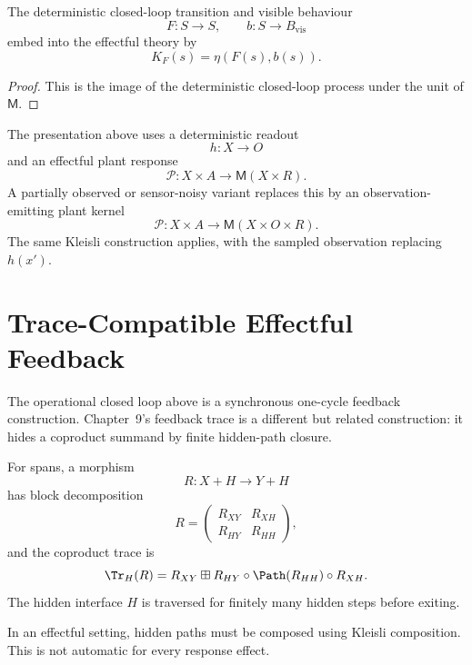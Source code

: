 \begin{corollary}
\label{cor:unit-embedding-deterministic-closed-loops}
The deterministic closed-loop transition and visible behaviour
\[
F:S\to S,
\qquad
b:S\to B_{\mathrm{vis}}
\]
embed into the effectful theory by
\[
K_F(s)=\eta(F(s),b(s)).
\]
\end{corollary}

\begin{proof}
This is the image of the deterministic closed-loop process under the unit of \(\mathsf M\).
\end{proof}

\begin{remark}
\label{rem:observation-emitting-plants}
The presentation above uses a deterministic readout
\[
h:X\to O
\]
and an effectful plant response
\[
\mathcal P:X\times A\to\mathsf M(X\times R).
\]
A partially observed or sensor-noisy variant replaces this by an observation-emitting plant kernel
\[
\mathcal P:X\times A\to\mathsf M(X\times O\times R).
\]
The same Kleisli construction applies, with the sampled observation replacing \(h(x')\).
\end{remark}

\section{Trace-Compatible Effectful Feedback}
\label{sec:trace-compatible-effectful-feedback}

The operational closed loop above is a synchronous one-cycle feedback construction.  Chapter~9's
feedback trace is a different but related construction: it hides a coproduct summand by finite
hidden-path closure.

For spans, a morphism
\[
R:X+H\to Y+H
\]
has block decomposition
\[
R=
\begin{pmatrix}
R_{XY} & R_{XH}\\
R_{HY} & R_{HH}
\end{pmatrix},
\]
and the coproduct trace is
\[
\Tr_H(R)
=
R_{XY}
\boxplus
R_{HY}\circ \Path(R_{HH})\circ R_{XH}.
\]
The hidden interface \(H\) is traversed for finitely many hidden steps before exiting.

In an effectful setting, hidden paths must be composed using Kleisli composition.  This is not
automatic for every response effect.

